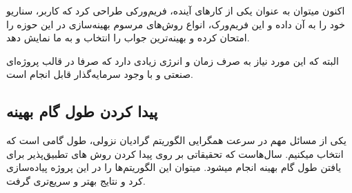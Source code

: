 اکنون میتوان به عنوان یکی از کارهای آینده، فریم‌ورکی طراحی کرد که کاربر، سناریو خود را به آن داده و این فریم‌ورک، انواع روش‌های مرسوم بهینه‌سازی در این حوزه را امتحان کرده و بهینه‌ترین جواب را انتخاب و به ما نمایش دهد.

البته که این مورد نیاز به صرف زمان و انرژی زیادی دارد که صرفا در قالب پروژه‌ای صنعتی و با وجود سرمایه‌گذار قابل انجام است.

\subsection{پیدا کردن طول گام بهینه}
یکی از مسائل مهم در سرعت همگرایی الگوریتم گرادیان نزولی، طول گامی است که انتخاب میکنیم. سال‌هاست که تحقیقاتی بر روی پیدا کردن روش های تطبیق‌پذیر برای یافتن طول گام بهینه انجام میشود. میتوان این الگوریتم‌ها را در این پروژه پیاده‌سازی کرد و نتایج بهتر و سریع‌تری گرفت. 
\newpage
‌